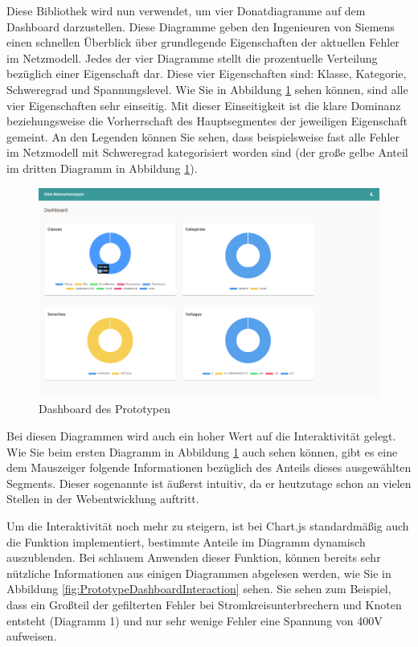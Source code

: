 Diese Bibliothek wird nun verwendet, um vier Donatdiagramme auf dem Dashboard darzustellen. Diese Diagramme geben den Ingenieuren von Siemens einen schnellen Überblick über grundlegende Eigenschaften der aktuellen Fehler im Netzmodell. Jedes der vier Diagramme stellt die prozentuelle Verteilung bezüglich einer Eigenschaft dar. Diese vier Eigenschaften sind: Klasse, Kategorie, Schweregrad und Spannungslevel. Wie Sie in Abbildung \ref{fig:PrototypeDashboard} sehen können, sind alle vier Eigenschaften sehr einseitig. Mit dieser Einseitigkeit ist die klare Dominanz beziehungsweise die Vorherrschaft des Hauptsegmentes der jeweiligen Eigenschaft gemeint. An den Legenden können Sie sehen, dass beispielsweise fast alle Fehler im Netzmodell mit Schweregrad  kategorisiert worden sind (der große gelbe Anteil im dritten Diagramm in Abbildung \ref{fig:PrototypeDashboard}).

\begin{figure}
    \centering
    \includegraphics[width=1\textwidth]{content/img/Empire/Frontend/Angular_Dashboard_Prototype.png}
    \caption{Dashboard des Prototypen}
    \label{fig:PrototypeDashboard}
\end{figure}
\FloatBarrier

Bei diesen Diagrammen wird auch ein hoher Wert auf die Interaktivität gelegt. Wie Sie beim ersten Diagramm in Abbildung \ref{fig:PrototypeDashboard} auch sehen können, gibt es eine dem Mauszeiger folgende Informationen bezüglich des Anteils dieses ausgewählten Segments. Dieser sogenannte  ist äußerst intuitiv, da er heutzutage schon an vielen Stellen in der Webentwicklung auftritt. \cite{chartjs-interactions}

Um die Interaktivität noch mehr zu steigern, ist bei Chart.js standardmäßig auch die Funktion implementiert, bestimmte Anteile im Diagramm dynamisch auszublenden. Bei schlauem Anwenden dieser Funktion, können bereits sehr nützliche Informationen aus einigen Diagrammen abgelesen werden, wie Sie in Abbildung \ref{fig:PrototypeDashboardInteraction} sehen. Sie sehen zum Beispiel, dass ein Großteil der gefilterten Fehler bei Stromkreisunterbrechern und Knoten entsteht (Diagramm 1) und nur sehr wenige Fehler eine Spannung von 400V aufweisen. \cite{chartjs-legend}

